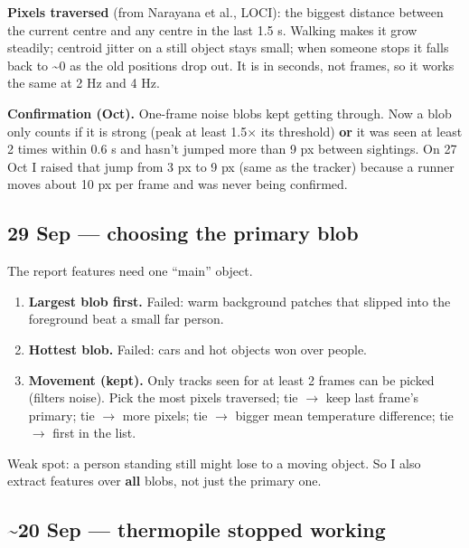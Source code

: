 \documentclass[11pt,a4paper]{article}
\providecommand{\tightlist}{\setlength{\itemsep}{0pt}\setlength{\parskip}{0pt}}
\begin{document}
\textbf{Pixels traversed}
(from Narayana et al., LOCI):
the biggest distance between
the current centre and any
centre in the last 1.5 s.
Walking makes it grow
steadily; centroid jitter on a
still object stays small; when
someone stops it falls back to
\textasciitilde0 as the old
positions drop out. It is in
seconds, not frames, so it
works the same at 2 Hz and 4
Hz.

\textbf{Confirmation (Oct).}
One-frame noise blobs kept
getting through. Now a blob
only counts if it is strong
(peak at least 1.5$\times$ its
threshold) \textbf{or} it was
seen at least 2 times within
0.6 s and hasn't jumped more
than 9 px between sightings.
On 27 Oct I raised that jump
from 3 px to 9 px (same as the
tracker) because a runner
moves about 10 px per frame
and was never being confirmed.

\hypertarget{sep-choosing-the-primary-blob}{%
\subsection{29 Sep ---
choosing the primary
blob}\label{sep-choosing-the-primary-blob}}

The report features need one
``main'' object.

\begin{enumerate}
\def\labelenumi{\arabic{enumi}.}
\tightlist
\item
  \textbf{Largest blob first.}
  Failed: warm background
  patches that slipped into
  the foreground beat a small
  far person.
\item
  \textbf{Hottest blob.}
  Failed: cars and hot objects
  won over people.
\item
  \textbf{Movement (kept).}
  Only tracks seen for at
  least 2 frames can be picked
  (filters noise). Pick the
  most pixels traversed; tie $\rightarrow$
  keep last frame's primary;
  tie $\rightarrow$ more pixels; tie $\rightarrow$
  bigger mean temperature
  difference; tie $\rightarrow$ first in
  the list.
\end{enumerate}

Weak spot: a person standing
still might lose to a moving
object. So I also extract
features over \textbf{all}
blobs, not just the primary
one.

\hypertarget{sep-thermopile-stopped-working}{%
\subsection{\textasciitilde20
Sep --- thermopile stopped
working}\label{sep-thermopile-stopped-working}}
\end{document}
